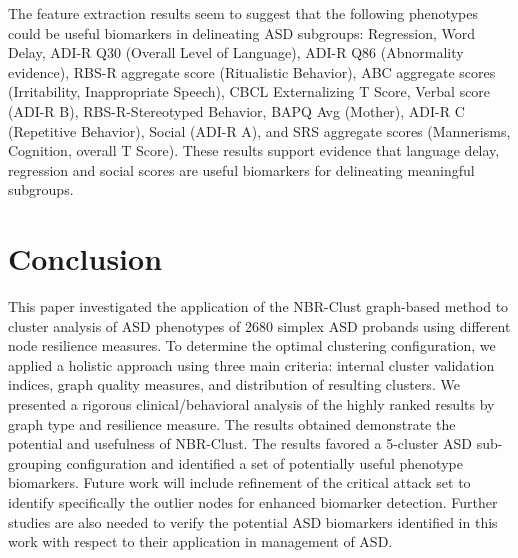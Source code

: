 \documentclass{bmcart}
\begin{document}
The feature extraction results seem to suggest that the following phenotypes could be useful biomarkers in delineating ASD subgroups: Regression, Word Delay, ADI-R Q30 (Overall Level of Language), ADI-R Q86 (Abnormality evidence), RBS-R aggregate score (Ritualistic Behavior), ABC aggregate scores (Irritability, Inappropriate Speech), CBCL Externalizing T Score, Verbal score (ADI-R B), RBS-R-Stereotyped Behavior, BAPQ Avg (Mother), ADI-R C (Repetitive Behavior), Social (ADI-R A), and SRS aggregate scores (Mannerisms, Cognition, overall T Score). These results support evidence that language delay, regression and social scores are useful biomarkers for delineating meaningful subgroups. 




\section*{Conclusion}
This paper investigated the application of the NBR-Clust graph-based method to cluster analysis of ASD phenotypes of 2680 simplex ASD probands using different node resilience measures. To determine the optimal clustering configuration, we applied a holistic approach using three main criteria: internal cluster validation indices, graph quality measures, and distribution of
resulting clusters. We presented a rigorous
clinical/behavioral analysis of the highly ranked results by graph type and resilience measure.
The results obtained demonstrate the potential and usefulness of NBR-Clust.
The results favored a 5-cluster ASD sub-grouping configuration and identified a set of potentially useful phenotype biomarkers. Future work will include refinement of the critical attack set to identify specifically the outlier nodes for enhanced biomarker detection. Further studies are also needed to verify the potential ASD biomarkers identified in this work with respect to their application in management of ASD.

\end{document}

